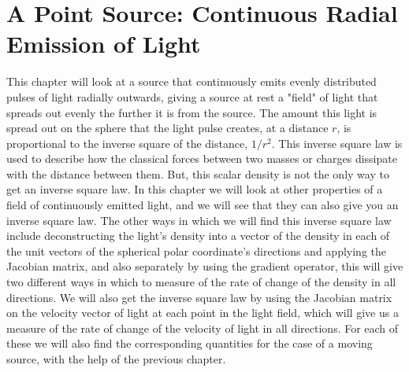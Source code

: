 

\printbibliography[segment=\therefsegment, heading=subbibliography]

\chapter{A Point Source: Continuous Radial Emission of Light} \label{ch: A Point Source Continually Emitting Light} %

This chapter will look at a source that continuously emits evenly distributed pulses of light radially outwards, giving a source at rest a "field" of light that spreads out evenly the further it is from the source.
The amount this light is spread out on the sphere that the light pulse creates, at a distance $r$, is proportional to the inverse square of the distance, $1/r^2$.
This inverse square law is used to describe how the classical forces between two masses or charges dissipate with the distance between them.
But, this scalar density is not the only way to get an inverse square law.
In this chapter we will look at other properties of a field of continuously emitted light, and we will see that they can also give you an inverse square law.
The other ways in which we will find this inverse square law include deconstructing the light's density into a vector of the density in each of the unit vectors of the spherical polar coordinate's directions and applying the Jacobian matrix, and also separately by using the gradient operator, this will give two different ways in which to measure of the rate of change of the density in all directions.
We will also get the inverse square law by using the Jacobian matrix on the velocity vector of light at each point in the light field, which will give us a measure of the rate of change of the velocity of light in all directions.
For each of these we will also find the corresponding quantities for the case of a moving source, with the help of the previous chapter.

